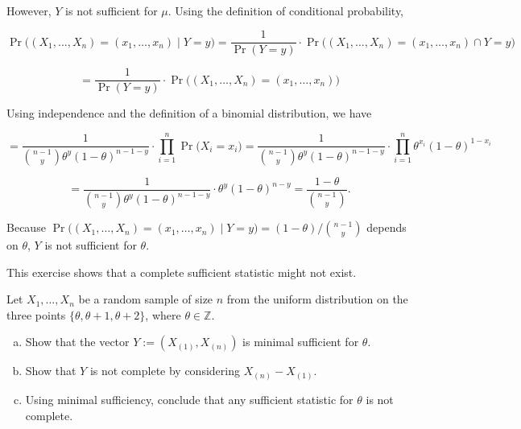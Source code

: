 \begin{example}
\

However, \(Y\) is not sufficient for \(\mu\). Using the definition of conditional probability, 

%

\[
\Pr\big( (X_1, \ldots, X_n) = (x_1, \ldots, x_n) \mid Y = y \big) = \frac{1}{\Pr(Y=y)} \cdot \Pr\big( (X_1, \ldots, X_n) = (x_1, \ldots, x_n) \cap Y = y \big) 
\]

\[
= \frac{1}{\Pr(Y=y)} \cdot \Pr\big( (X_1, \ldots, X_n) = (x_1, \ldots, x_n) \big) 
\]

Using independence and the definition of a binomial distribution, we have

\[
= \frac{1}{\binom{n-1}{y} \theta^y (1 - \theta)^{n-1-y}} \cdot \prod_{i=1}^n \Pr\big( X_i = x_i \big)  =  \frac{1}{\binom{n-1}{y} \theta^y (1 - \theta)^{n-1-y}}  \cdot \prod_{i=1}^n \theta^{x_i} (1- \theta)^{1-x_i}
\]

\[
=  \frac{1}{\binom{n-1}{y} \theta^y (1 - \theta)^{n-1-y}} \cdot \theta^{y} (1- \theta)^{n-y} = \frac{1-\theta}{\binom{n-1}{y}}.
\]

Because \(\Pr\big( (X_1, \ldots, X_n) = (x_1, \ldots, x_n) \mid Y = y \big)  = (1-\theta)/\binom{n-1}{y} \) depends on \(\theta\), \(Y\) is not sufficient for \(\theta\).

\end{example}

\begin{exercise}
This exercise shows that a complete sufficient statistic might not exist.

Let $X_{1},\ldots,X_{n}$ be a random sample of size $n$ from the uniform distribution on the three points $\{\theta,\theta+1,\theta+2\}$, where $\theta\in \mathbb{Z}$.
\begin{enumerate}[(a)]
\item Show that the vector $Y:= (X_{(1)},X_{(n)})$ is minimal sufficient for $\theta$.
\item Show that $Y$ is not complete by considering $X_{(n)}-X_{(1)}$.
\item Using minimal sufficiency, conclude that any sufficient statistic for $\theta$ is not complete.
\end{enumerate}
\end{exercise}

